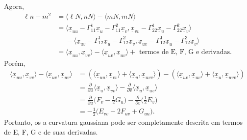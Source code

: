 \documentclass[../differential_geometry.tex]{subfiles}
\begin{document}
\begin{proof*}
	Agora,
	\begin{align*}
		\ell n - m^{2} & =\langle \ell N, nN \rangle - \langle mN, mN \rangle                                                                                                                                            \\
		               & = \langle \underline{x}_{uu}-\Gamma_{11}^{1}\underline{x}_u - \Gamma_{11}^{2}\underline{x}_v, \underline{x}_{vv}-\Gamma_{22}^{1}\underline{x}_u - \Gamma_{22}^{2}\underline{x}_v \rangle        \\
		               & \quad\;- \langle \underline{x}_{uv}-\Gamma_{12}^1\underline{x}_{u} - \Gamma_{12}^{2}\underline{x}_v, \underline{x}_{uv}-\Gamma_{12}^{1}\underline{x}_u - \Gamma_{12}^{2}\underline{x}_v \rangle \\
		               & = \langle \underline{x}_{uu}, \underline{x}_{vv} \rangle - \langle \underline{x}_{uv}, \underline{x}_{uv} \rangle + \text{ termos de E, F, G e derivadas.}
	\end{align*}
	Porém,
	\begin{align*}
		\langle \underline{x}_{uu}, \underline{x}_{vv} \rangle - \langle \underline{x}_{uv}, \underline{x}_{uv} \rangle & = (\langle \underline{x}_{uu}, \underline{x}_{vv} \rangle + \langle \underline{x}_{u}, \underline{x}_{uvv} \rangle)-(\langle \underline{x}_{uv}, \underline{x}_{uv} \rangle + \langle \underline{x}_{u}, \underline{x}_{uvv} \rangle) \\
		                                                                                                                & =\frac{\partial^{}}{\partial u^{}}\langle \underline{x}_{u}, \underline{x}_{vv} \rangle - \frac{\partial^{}}{\partial v^{}}\langle \underline{x}_{u}, \underline{x}_{uv} \rangle                                                      \\
		                                                                                                                & =\frac{\partial^{}}{\partial u^{}}\biggl(F_{v}-\frac{1}{2}G_{u}\biggr)-\frac{\partial^{}}{\partial v^{}}\biggl(\frac{1}{2}E_{v}\biggr)                                                                                                \\
		                                                                                                                & = -\frac{1}{2}\biggl(E_{vv} - 2F_{uv} + G_{uu}\biggr).
	\end{align*}
	Portanto, os a curvatura gaussiana pode ser completamente descrita em termos de E, F, G e de suas derivadas. \qedsymbol
\end{proof*}
\end{document}
